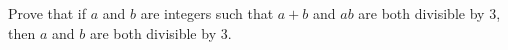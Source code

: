 Prove that if $a$ and $b$ are integers such that $a+b$ and $ab$ are both divisible by $3$, then $a$ and $b$ are both divisible by $3$.
